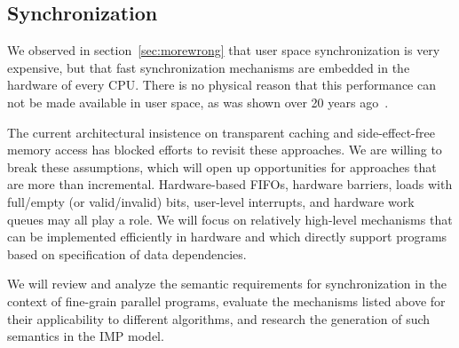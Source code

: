 \subsection{Synchronization}
\label{sec:proposed-sync}

We observed in section~\ref{sec:morewrong} that user space
synchronization is very expensive, but that fast synchronization
mechanisms are embedded in the hardware of every CPU. 
There is no physical reason that this performance can not be made
available in user space, as was shown over 20 years 
ago~\cite{Dally:1992:MDP}.

The current architectural insistence on transparent caching and 
side-effect-free memory access has blocked efforts to revisit these
approaches.  We are willing to break these assumptions, which 
will open up opportunities for approaches that are more than 
incremental.  Hardware-based FIFOs,  hardware barriers,
loads with full/empty  (or valid/invalid) bits, user-level interrupts, 
and hardware work queues may all play a role.  We will focus on 
relatively high-level mechanisms that can be implemented 
efficiently in hardware and which directly support programs 
based on specification of data dependencies.

We will review and analyze the semantic requirements for synchronization
in the context of fine-grain parallel programs, evaluate the mechanisms
listed above for their applicability to different algorithms,
and research the generation of such semantics in the \ac{IMP} model.

